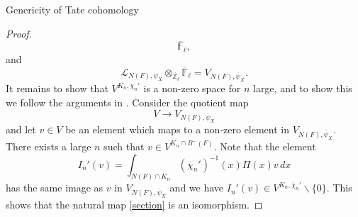 \documentclass[10pt, reqno]{amsart}
\theoremstyle{plain}
\numberwithin{equation}{section}
\begin{document}
\begin{section}{Genericity of Tate cohomology}
\begin{proof}
$$\overline{\mathbb{F}}_\ell,$$
and 
$$\mathcal{L}_{N(F),\psi_X}
\otimes_{\overline{\mathbb{Z}}_\ell}
\overline{\mathbb{F}}_\ell
=V_{N(F), \overline{\psi}_X}.$$
It remains to show that $V^{K_n, \chi_n'}$ is a non-zero
space for $n$ large, and to show this we follow 
the arguments in \cite[Lemme I.10]{MW_paper}. 
Consider the quotient  map 
$$V\rightarrow V_{N(F), \overline{\psi}_X}$$
and let $v\in V$ be an element which maps to a non-zero 
element in $V_{N(F), \overline{\psi}_X}$. 
There exists a large $n$
such that $v\in V^{K_n\cap B^-(F)}$. Note that 
the element 
$$I_n'(v)=\int_{N(F)\cap K_n} (\overline{\chi}_n')^{-1}(x)\Pi(x)v\,dx $$
has the same image as $v$ in $V_{N(F), \overline{\psi}_X}$ and
we have $I_n'(v)\in V^{K_n,\overline{\chi}_n'}\backslash \{0\}$.
This shows that the natural map \eqref{section} is an isomorphism. 



\end{proof}
\end{section}
\end{document}
